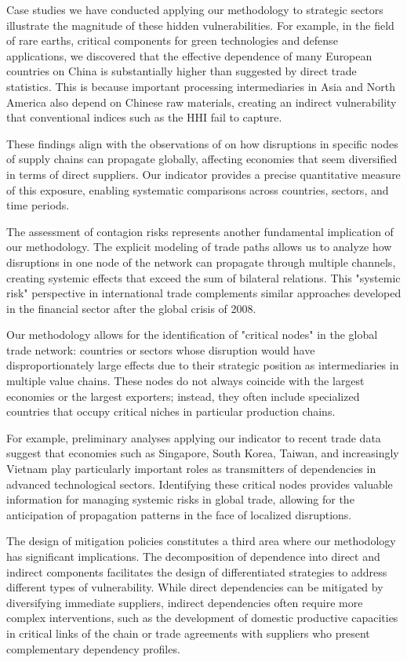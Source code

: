 \documentclass[final,1p,times,authoryear]{elsarticle}
\begin{document}
Case studies we have conducted applying our methodology to strategic sectors illustrate the magnitude of these hidden vulnerabilities. For example, in the field of rare earths, critical components for green technologies and defense applications, we discovered that the effective dependence of many European countries on China is substantially higher than suggested by direct trade statistics. This is because important processing intermediaries in Asia and North America also depend on Chinese raw materials, creating an indirect vulnerability that conventional indices such as the HHI fail to capture.

These findings align with the observations of \citet{Campbell2024} on how disruptions in specific nodes of supply chains can propagate globally, affecting economies that seem diversified in terms of direct suppliers. Our indicator provides a precise quantitative measure of this exposure, enabling systematic comparisons across countries, sectors, and time periods.

The assessment of contagion risks represents another fundamental implication of our methodology. The explicit modeling of trade paths allows us to analyze how disruptions in one node of the network can propagate through multiple channels, creating systemic effects that exceed the sum of bilateral relations. This "systemic risk" perspective in international trade complements similar approaches developed in the financial sector after the global crisis of 2008.

Our methodology allows for the identification of "critical nodes" in the global trade network: countries or sectors whose disruption would have disproportionately large effects due to their strategic position as intermediaries in multiple value chains. These nodes do not always coincide with the largest economies or the largest exporters; instead, they often include specialized countries that occupy critical niches in particular production chains.

For example, preliminary analyses applying our indicator to recent trade data suggest that economies such as Singapore, South Korea, Taiwan, and increasingly Vietnam play particularly important roles as transmitters of dependencies in advanced technological sectors. Identifying these critical nodes provides valuable information for managing systemic risks in global trade, allowing for the anticipation of propagation patterns in the face of localized disruptions.

The design of mitigation policies constitutes a third area where our methodology has significant implications. The decomposition of dependence into direct and indirect components facilitates the design of differentiated strategies to address different types of vulnerability. While direct dependencies can be mitigated by diversifying immediate suppliers, indirect dependencies often require more complex interventions, such as the development of domestic productive capacities in critical links of the chain or trade agreements with suppliers who present complementary dependency profiles.
\end{document}
